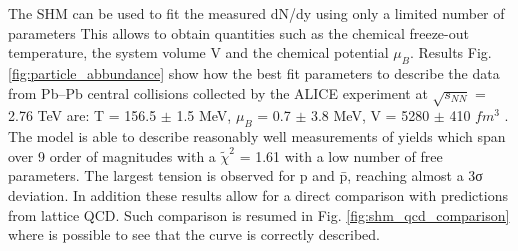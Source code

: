 \documentclass[12pt,a4paper]{book}
\begin{document}
	The SHM can be used to fit the measured dN/dy using only a limited number of parameters This allows to obtain quantities such as the chemical freeze-out temperature, the system volume V and the chemical potential $\mu_B$. Results Fig. \ref{fig:particle_abbundance} show how the best fit parameters to describe the data from Pb–Pb central collisions collected by the ALICE experiment at $\sqrt{s_{NN}}$ = 2.76 TeV are:	T = 156.5 $\pm$ 1.5 MeV, $μ_B$ = 0.7 $\pm$ 3.8 MeV, V = 5280 $\pm$ 410 $fm^3$ . The model is able to describe reasonably well measurements of yields which span over 9 order of magnitudes with a $\tilde{\chi}^2$ = 1.61 with a low number of free parameters. The largest tension is observed for p and p̄, reaching almost a 3σ deviation. \cite{Andronic_2017} In addition these results allow for a direct comparison with predictions from lattice QCD. Such comparison is resumed in Fig. \ref{fig:shm_qcd_comparison} where is possible to see that the curve is correctly described.
	
\end{document}
